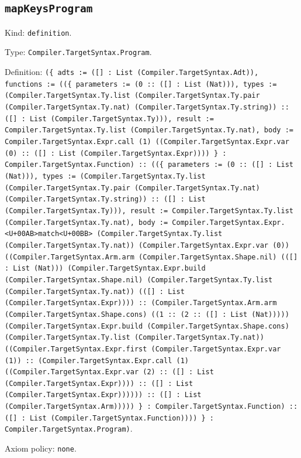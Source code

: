 \documentclass[11pt]{article}
\begin{document}
\subsection*{\texttt{mapKeysProgram}}
\noindent Kind: \texttt{definition}.\par
\noindent Type: \texttt{Compiler.TargetSyntax.Program}.\par
\noindent Definition: \texttt{(\{ adts := ([] : List (Compiler.TargetSyntax.Adt)), functions := ((\{ parameters := (0 :: ([] : List (Nat))), types := (Compiler.TargetSyntax.Ty.list (Compiler.TargetSyntax.Ty.pair (Compiler.TargetSyntax.Ty.nat) (Compiler.TargetSyntax.Ty.string)) :: ([] : List (Compiler.TargetSyntax.Ty))), result := Compiler.TargetSyntax.Ty.list (Compiler.TargetSyntax.Ty.nat), body := Compiler.TargetSyntax.Expr.call (1) ((Compiler.TargetSyntax.Expr.var (0) :: ([] : List (Compiler.TargetSyntax.Expr)))) \} : Compiler.TargetSyntax.Function) :: ((\{ parameters := (0 :: ([] : List (Nat))), types := (Compiler.TargetSyntax.Ty.list (Compiler.TargetSyntax.Ty.pair (Compiler.TargetSyntax.Ty.nat) (Compiler.TargetSyntax.Ty.string)) :: ([] : List (Compiler.TargetSyntax.Ty))), result := Compiler.TargetSyntax.Ty.list (Compiler.TargetSyntax.Ty.nat), body := Compiler.TargetSyntax.Expr.<U+00AB>match<U+00BB> (Compiler.TargetSyntax.Ty.list (Compiler.TargetSyntax.Ty.nat)) (Compiler.TargetSyntax.Expr.var (0)) ((Compiler.TargetSyntax.Arm.arm (Compiler.TargetSyntax.Shape.nil) (([] : List (Nat))) (Compiler.TargetSyntax.Expr.build (Compiler.TargetSyntax.Shape.nil) (Compiler.TargetSyntax.Ty.list (Compiler.TargetSyntax.Ty.nat)) (([] : List (Compiler.TargetSyntax.Expr)))) :: (Compiler.TargetSyntax.Arm.arm (Compiler.TargetSyntax.Shape.cons) ((1 :: (2 :: ([] : List (Nat))))) (Compiler.TargetSyntax.Expr.build (Compiler.TargetSyntax.Shape.cons) (Compiler.TargetSyntax.Ty.list (Compiler.TargetSyntax.Ty.nat)) ((Compiler.TargetSyntax.Expr.first (Compiler.TargetSyntax.Expr.var (1)) :: (Compiler.TargetSyntax.Expr.call (1) ((Compiler.TargetSyntax.Expr.var (2) :: ([] : List (Compiler.TargetSyntax.Expr)))) :: ([] : List (Compiler.TargetSyntax.Expr)))))) :: ([] : List (Compiler.TargetSyntax.Arm))))) \} : Compiler.TargetSyntax.Function) :: ([] : List (Compiler.TargetSyntax.Function)))) \} : Compiler.TargetSyntax.Program)}.\par
\noindent Axiom policy: \texttt{none}.\par
\end{document}

